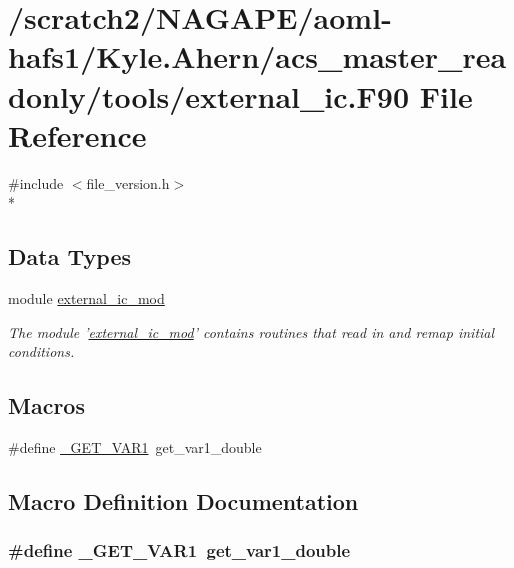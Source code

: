 \section{/scratch2/\-N\-A\-G\-A\-P\-E/aoml-\/hafs1/\-Kyle.Ahern/acs\-\_\-master\-\_\-readonly/tools/external\-\_\-ic.F90 File Reference}
\label{external__ic_8F90}
{\ttfamily \#include $<$file\-\_\-version.\-h$>$}\\*
\subsection*{Data Types}
\begin{DoxyCompactItemize}
\item 
module \hyperlink{classexternal__ic__mod}{external\-\_\-ic\-\_\-mod}
\begin{DoxyCompactList}\small\item\em The module '\hyperlink{classexternal__ic__mod}{external\-\_\-ic\-\_\-mod}' contains routines that read in and remap initial conditions. \end{DoxyCompactList}\end{DoxyCompactItemize}
\subsection*{Macros}
\begin{DoxyCompactItemize}
\item 
\#define \hyperlink{external__ic_8F90_aa573d7adaa945bb61ee4d9ca00756c63}{\-\_\-\-G\-E\-T\-\_\-\-V\-A\-R1}~get\-\_\-var1\-\_\-double
\end{DoxyCompactItemize}


\subsection{Macro Definition Documentation}
\subsubsection[{\-\_\-\-G\-E\-T\-\_\-\-V\-A\-R1}]{\setlength{\rightskip}{0pt plus 5cm}\#define \-\_\-\-G\-E\-T\-\_\-\-V\-A\-R1~get\-\_\-var1\-\_\-double}\label{external__ic_8F90_aa573d7adaa945bb61ee4d9ca00756c63}
